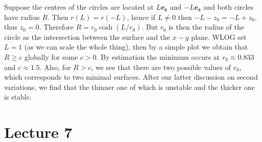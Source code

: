\documentclass[a4paper]{article}
\begin{document}
\begin{example}
    Suppose the centres of the circles are located at $L\mathbf{e_z}$ and $-L\mathbf{e_z}$ and both circles have radius $R$.
    Then $r(L)=r(-L)$, hence if $L\neq 0$ then $-L-z_0=-L+z_0$, thus $z_0=0$.
    Therefore $R=r_0\cosh(L/r_0)$.
    But $r_0$ is then the radius of the circle as the intersection between the surface and the $x-y$ plane.
    WLOG set $L=1$ (as we can scale the whole thing), then by a simple plot we obtain that $R\ge c$ globally for some $c>0$.
    By estimation the minimum occurs at $r_0\approx 0.833$ and $c\approx 1.5$.
    Also, for $R>c$, we see that there are two possible values of $r_0$, which corresponds to two minimal surfaces.
    After our latter discussion on second variations, we find that the thinner one of which is unstable and the thicker one is stable.
\end{example}

\newpage
\part*{Lecture 7}
\end{document}
